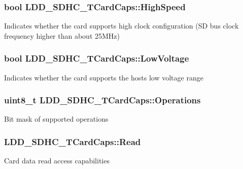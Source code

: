 \subsubsection[{High\+Speed}]{\setlength{\rightskip}{0pt plus 5cm}bool L\+D\+D\+\_\+\+S\+D\+H\+C\+\_\+\+T\+Card\+Caps\+::\+High\+Speed}\label{struct_l_d_d___s_d_h_c___t_card_caps_a382fb9e854ee58ba00f5e390345dad9c}
Indicates whether the card supports high clock configuration (S\+D bus clock frequency higher than about 25\+M\+Hz) \hypertarget{struct_l_d_d___s_d_h_c___t_card_caps_a283a376bda2540641d83cde61d1e0188}{}
\subsubsection[{Low\+Voltage}]{\setlength{\rightskip}{0pt plus 5cm}bool L\+D\+D\+\_\+\+S\+D\+H\+C\+\_\+\+T\+Card\+Caps\+::\+Low\+Voltage}\label{struct_l_d_d___s_d_h_c___t_card_caps_a283a376bda2540641d83cde61d1e0188}
Indicates whether the card supports the host\textquotesingle{}s low voltage range \hypertarget{struct_l_d_d___s_d_h_c___t_card_caps_a4af30c5df5445720a0da2f6abdcc9629}{}
\subsubsection[{Operations}]{\setlength{\rightskip}{0pt plus 5cm}uint8\+\_\+t L\+D\+D\+\_\+\+S\+D\+H\+C\+\_\+\+T\+Card\+Caps\+::\+Operations}\label{struct_l_d_d___s_d_h_c___t_card_caps_a4af30c5df5445720a0da2f6abdcc9629}
Bit mask of supported operations \hypertarget{struct_l_d_d___s_d_h_c___t_card_caps_ae5a39842e7b8c28f9246d3fc1b9a8f54}{}
\subsubsection[{Read}]{ L\+D\+D\+\_\+\+S\+D\+H\+C\+\_\+\+T\+Card\+Caps\+::\+Read}\label{struct_l_d_d___s_d_h_c___t_card_caps_ae5a39842e7b8c28f9246d3fc1b9a8f54}
Card data read access capabilities \hypertarget{struct_l_d_d___s_d_h_c___t_card_caps_ad28c378a6b9edfbd726a8019d5c8be79}{}
